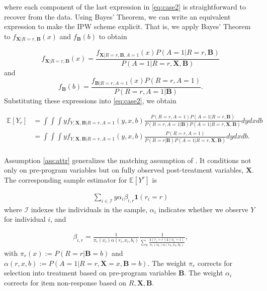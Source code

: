 \noindent where each component of the last expression in \eqref{eq:case2} is straightforward to recover from the data. Using Bayes' Theorem, we can write an equivalent expression to make the IPW scheme explicit. That is, we apply Bayes' Theorem to $f_{\bm{X} | R=r, \bm{B} }(x)$ and $f_{\bm{B}} (b)$ to obtain

\begin{equation*}
f_{\bm{X}|R=r,\bm{B}}(x) = \frac{f_{\bm{X}|R=r,\bm{B},A=1}(x) P(A=1|R=r,\bm{B})}{P(A=1|R=r,\bm{X},\bm{B})}
\end{equation*}
and
\begin{equation*}
	f_{\bm{B}} (b) = \frac{f_{\bm{B}|R=r,A=1} (x) P(R=r,A=1)}{P(R=r,A=1|\bm{B})}.
\end{equation*}
\noindent Substituting these expressions into \eqref{eq:case2}, we obtain

\begin{align*} \label{eq:case2ipw}
\mathbb{E}[Y_r] & = \int \int \int y f_{Y,\bm{X},\bm{B}|R=r,A=1}(y,x,b) \frac{P(R=r,A=1) P(A=1|R=r,\bm{B})}{P(R=r,A=1|\bm{B}) P(A=1|R=r,\bm{X},\bm{B})} dydxdb \\
	            & = \int \int  \int y f_{Y,\bm{X},\bm{B}|R=r,A=1}(y,x,b) \frac{P(R=r,A=1)}{P(R=r|\bm{B}) P(A=1|R=r,\bm{X},\bm{B})} dydxdb. \\
\end{align*}

\noindent Assumption \ref{ass:attr} generalizes the matching assumption of \citet{Campbell_Conti_etal_2014_EarlyChildhoodInvestments}. It conditions not only on pre-program variables but on fully observed post-treatment variables, $\bm{X}$. The corresponding sample estimator for $\mathbb{E}[Y^r]$ is

\begin{align*}
\sum_{i \in \mathcal{I}} y \alpha_{i} \beta_{i,r} \mathbf{1}(r_i = r)
\end{align*}
\noindent where $\mathcal{I}$ indexes the individuals in the sample, $\alpha_i$ indicates whether we observe $Y$ for individual $i$, and

\begin{align*}
	\beta_{i,r} = \frac{1}{\pi_r(x_i) \alpha(r_i,x_i,b_i)} \frac{1}{\sum_k{\frac{\mathbf{1}(r_i = r) \mathbf{1}(\alpha_i = 1)}{\pi_r(x_k)\alpha(r_k,x_k,b_k)}}},
\end{align*}
\noindent with $\pi_r(x) := P(R=r|\bm{B}=b)$ and $\alpha(r,x,b) := P(A=1|R=r,\bm{X}=x,\bm{B}=b)$. The weight $\pi_r$ corrects for selection into treatment based on pre-program variables $\bm{B}$. The weight $\alpha_{i}$ corrects for item non-response based on $R, \bm{X}, \bm{B}$.\\

